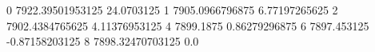 0 7922.39501953125 24.0703125
1 7905.0966796875 6.77197265625
2 7902.4384765625 4.11376953125
4 7899.1875 0.86279296875
6 7897.453125 -0.87158203125
8 7898.32470703125 0.0
